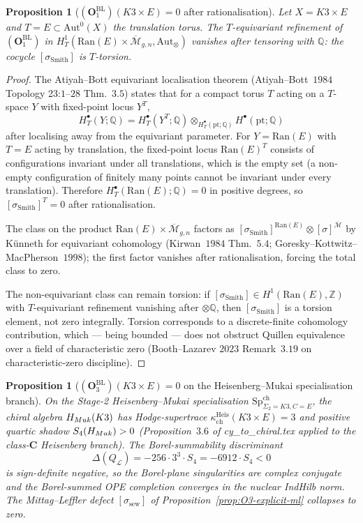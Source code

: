 \documentclass[11pt]{amsart}
\newtheorem{proposition}[theorem]{Proposition}
\newcommand{\kch}{\kappa_{\mathrm{ch}}}
\newcommand{\cL}{\mathcal{L}}
\newcommand{\Ran}{\mathrm{Ran}}
\newcommand{\Mbar}{\overline{\mathcal{M}}}
\newcommand{\bZ}{\mathbb{Z}}
\newcommand{\bQ}{\mathbb{Q}}
\newcommand{\Aut}{\mathrm{Aut}}
\begin{document}
\begin{proposition}[$(\mathbf{O}_1^{\mathrm{BL}})(K3 \times E) = 0$
after rationalisation]
\label{prop:k3xe-O1-vanish}
Let $X = K3 \times E$ and $T = E \subset \Aut^0(X)$ the translation
torus. The $T$-equivariant refinement of
$(\mathbf{O}_1^{\mathrm{BL}})$ in
$H^1_T(\Ran(E) \times \Mbar_{g,n}, \Aut_\otimes)$ vanishes after
tensoring with $\bQ$: the cocycle $[\sigma_{\mathrm{Smith}}]$ is
$T$-torsion.
\end{proposition}

\begin{proof}
The Atiyah--Bott equivariant localisation theorem
(Atiyah--Bott~$1984$ Topology 23:$1$--$28$ Thm.~$3.5$) states that
for a compact torus $T$ acting on a $T$-space $Y$ with fixed-point
locus $Y^T$,
\[
H^\bullet_T(Y; \bQ) = H^\bullet_T(Y^T; \bQ)
\otimes_{H^\bullet_T(\mathrm{pt}; \bQ)} H^\bullet(\mathrm{pt}; \bQ)
\]
after localising away from the equivariant parameter. For
$Y = \Ran(E)$ with $T = E$ acting by translation, the fixed-point
locus $\Ran(E)^T$ consists of configurations invariant under all
translations, which is the empty set (a non-empty configuration
of finitely many points cannot be invariant under every
translation). Therefore $H^\bullet_T(\Ran(E); \bQ) = 0$ in positive
degrees, so $[\sigma_{\mathrm{Smith}}]^T = 0$ after rationalisation.

The class on the product $\Ran(E) \times \Mbar_{g,n}$ factors as
$[\sigma_{\mathrm{Smith}}]^{\Ran(E)} \otimes [\sigma]^{\Mbar}$ by
Künneth for equivariant cohomology (Kirwan~$1984$ Thm.~$5.4$;
Goresky--Kottwitz--MacPherson~$1998$); the first factor vanishes
after rationalisation, forcing the total class to zero.

The non-equivariant class can remain torsion: if
$[\sigma_{\mathrm{Smith}}] \in H^1(\Ran(E), \bZ)$ with
$T$-equivariant refinement vanishing after $\otimes \bQ$, then
$[\sigma_{\mathrm{Smith}}]$ is a torsion element, not zero
integrally. Torsion corresponds to a discrete-finite cohomology
contribution, which --- being bounded --- does not obstruct
Quillen equivalence over a field of characteristic zero
(Booth--Lazarev $2023$ Remark~$3.19$ on characteristic-zero
discipline).
\end{proof}

\begin{proposition}[$(\mathbf{O}_3^{\mathrm{BL}})(K3 \times E) = 0$
on the Heisenberg--Mukai specialisation branch]
\label{prop:k3xe-O3-vanish-heis}
On the Stage-2 Heisenberg--Mukai specialisation
$\mathrm{Sp}^{\mathrm{ch}}_{\Sigma_2 = K3, C = E}$, the chiral
algebra $H_{Muk}(K3)$ has Hodge-supertrace
$\kch^{\mathrm{Heis}}(K3 \times E) = 3$ and positive quartic
shadow $S_4(H_{Muk}) > 0$
(Proposition~$3.6$ of cy\_to\_chiral.tex applied to the
class-$\mathbf{C}$ Heisenberg branch). The Borel-summability
discriminant
\[
\Delta(Q_\cL) = -256 \cdot 3^3 \cdot S_4 = -6912 \cdot S_4 < 0
\]
is sign-definite negative, so the Borel-plane singularities are
complex conjugate and the Borel-summed OPE completion converges
in the nuclear IndHilb norm. The Mittag--Leffler defect
$[\sigma_{\mathrm{sew}}]$ of
Proposition~\ref{prop:O3-explicit-ml} collapses to zero.
\end{proposition}
\end{document}
